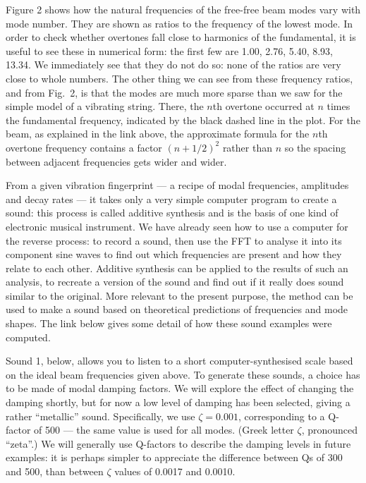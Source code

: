   Figure 2 shows how the natural frequencies of the free-free beam modes vary 
  with mode number. They are shown as ratios to the frequency of the lowest 
  mode. In order to check whether overtones fall close to harmonics of the 
  fundamental, it is useful to see these in numerical form: the first few are 
  1.00, 2.76, 5.40, 8.93, 13.34. We immediately see that they do not do so: 
  none of the ratios are very close to whole numbers. The other thing we can 
  see from these frequency ratios, and from Fig.\ 2, is that the modes are much 
  more sparse than we saw for the simple model of a vibrating string. There, 
  the $n$th overtone occurred at $n$ times the fundamental frequency, indicated 
  by the black dashed line in the plot. For the beam, as explained in the link 
  above, the approximate formula for the $n$th overtone frequency contains a 
  factor $(n+1/2)^2$ rather than $n$ so the spacing between adjacent 
  frequencies gets wider and wider. 

  From a given vibration fingerprint --- a recipe of modal frequencies, 
  amplitudes and decay rates --- it takes only a very simple computer program 
  to create a sound: this process is called additive synthesis and is the basis 
  of one kind of electronic musical instrument. We have already seen how to use 
  a computer for the reverse process: to record a sound, then use the FFT to 
  analyse it into its component sine waves to find out which frequencies are 
  present and how they relate to each other. Additive synthesis can be applied 
  to the results of such an analysis, to recreate a version of the sound and 
  find out if it really does sound similar to the original. More relevant to 
  the present purpose, the method can be used to make a sound based on 
  theoretical predictions of frequencies and mode shapes. The link below gives 
  some detail of how these sound examples were computed. 

  Sound 1, below, allows you to listen to a short computer-synthesised scale 
  based on the ideal beam frequencies given above. To generate these sounds, a 
  choice has to be made of modal damping factors. We will explore the effect of 
  changing the damping shortly, but for now a low level of damping has been 
  selected, giving a rather ``metallic'' sound. Specifically, we use 
  $\zeta=0.001$, corresponding to a Q-factor of 500 --- the same value is used 
  for all modes. (Greek letter $\zeta$, pronounced ``zeta''.) We will generally 
  use Q-factors to describe the damping levels in future examples: it is 
  perhaps simpler to appreciate the difference between Qs of 300 and 500, than 
  between $\zeta$ values of 0.0017 and 0.0010. 

